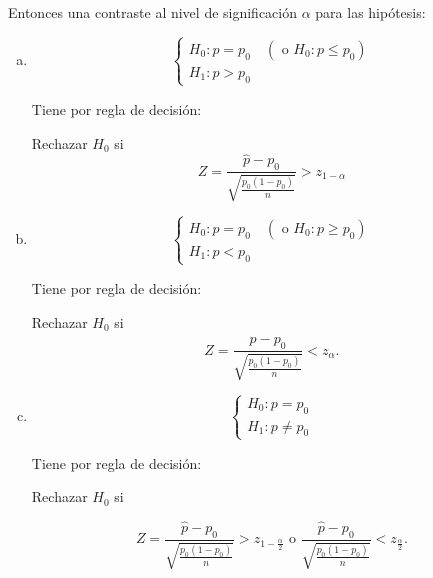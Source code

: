 \documentclass[12pt]{report}
\begin{document}
     Entonces una contraste al nivel de significación $\alpha$ para las
    hipótesis:
\begin{enumerate}[a)]
\item $$\left\{\begin{array}{l}
    H_{0}:p=p_{0} \quad (\mbox{ o } H_{0}:p\leq p_{0})\\
    H_{1}:p>p_{0}
    \end{array}\right.$$


    Tiene por regla de decisión:

    Rechazar $H_{0}$ si
    $$Z=
    \frac{\hat{p}-p_{0}}{
    {\sqrt{\frac{p_{0}(1-p_{0})}{n}}}}>z_{1-\alpha}$$

\item $$\left\{\begin{array}{l}
    H_{0}:p=p_{0} \quad (\mbox{ o } H_{0}:p\geq p_{0})\\
    H_{1}:p<p_{0}
    \end{array}\right.$$


    Tiene por regla de decisión:

    Rechazar $H_{0}$ si
    $$Z=
    \frac{\hat{p}-p_{0}}{
    {\sqrt{\frac{p_{0}(1-p_{0})}{n}}}}<z_{\alpha}.$$

\item $$\left\{\begin{array}{l}
    H_{0}:p=p_{0} \\
    H_{1}:p\not=p_{0}
    \end{array}\right.$$


    Tiene por regla de decisión:

    Rechazar $H_{0}$ si

    $$Z=
\frac{\hat{p}-p_{0}}{
    {\sqrt{\frac{p_{0}(1-p_{0})}{n}}}}>z_{1-\frac{\alpha}{2}} \mbox{ o } \frac{\hat{p}-p_{0}}{
    {\sqrt{\frac{p_{0}(1-p_{0})}{n}}}}<z_{\frac{\alpha}{2}}.$$
    
\end{enumerate}
    
\end{document}
